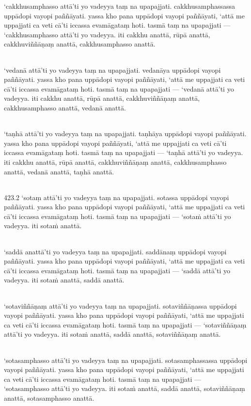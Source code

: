 \documentclass[9pt]{article}
\begin{document}
‘cakkhusamphasso attā’ti yo vadeyya taṃ na upapajjati. cakkhusamphassassa uppādopi vayopi paññāyati. yassa kho pana uppādopi vayopi paññāyati, ‘attā me uppajjati ca veti cā’ti iccassa evamāgataṃ hoti. tasmā taṃ na upapajjati — ‘cakkhusamphasso attā’ti yo vadeyya. iti cakkhu anattā, rūpā anattā, cakkhuviññāṇaṃ anattā, cakkhusamphasso anattā.\\\

‘vedanā attā’ti yo vadeyya taṃ na upapajjati. vedanāya uppādopi vayopi paññāyati. yassa kho pana uppādopi vayopi paññāyati, ‘attā me uppajjati ca veti cā’ti iccassa evamāgataṃ hoti. tasmā taṃ na upapajjati — ‘vedanā attā’ti yo vadeyya. iti cakkhu anattā, rūpā anattā, cakkhuviññāṇaṃ anattā, cakkhusamphasso anattā, vedanā anattā.\\\

‘taṇhā attā’ti yo vadeyya taṃ na upapajjati. taṇhāya uppādopi vayopi paññāyati. yassa kho pana uppādopi vayopi paññāyati, ‘attā me uppajjati ca veti cā’ti iccassa evamāgataṃ hoti. tasmā taṃ na upapajjati — ‘taṇhā attā’ti yo vadeyya. iti cakkhu anattā, rūpā anattā, cakkhuviññāṇaṃ anattā, cakkhusamphasso anattā, vedanā anattā, taṇhā anattā.\\\

423.2 ‘sotaṃ attā’ti yo vadeyya taṃ na upapajjati. sotassa uppādopi vayopi paññāyati. yassa kho pana uppādopi vayopi paññāyati, ‘attā me uppajjati ca veti cā’ti iccassa evamāgataṃ hoti. tasmā taṃ na upapajjati — ‘sotaṁ attā’ti yo vadeyya. iti sotaṁ anattā.\\\

‘saddā anattā’ti yo vadeyya taṃ na upapajjati. saddānaṃ uppādopi vayopi paññāyati. yassa kho pana uppādopi vayopi paññāyati, ‘attā me uppajjati ca veti cā’ti iccassa evamāgataṃ hoti. tasmā taṃ na upapajjati — ‘saddā attā’ti yo vadeyya. iti sotaṁ anattā, saddā anattā.\\\

‘sotaviññāṇaṃ attā’ti yo vadeyya taṃ na upapajjati. sotaviññāṇassa uppādopi vayopi paññāyati. yassa kho pana uppādopi vayopi paññāyati, ‘attā me uppajjati ca veti cā’ti iccassa evamāgataṃ hoti. tasmā taṃ na upapajjati — ‘sotaviññāṇaṃ attā’ti yo vadeyya. iti sotaṁ anattā, saddā anattā, sotaviññāṇaṃ anattā.\\\

‘sotasamphasso attā’ti yo vadeyya taṃ na upapajjati. sotasamphassassa uppādopi vayopi paññāyati. yassa kho pana uppādopi vayopi paññāyati, ‘attā me uppajjati ca veti cā’ti iccassa evamāgataṃ hoti. tasmā taṃ na upapajjati — ‘sotasamphasso attā’ti yo vadeyya. iti sotaṁ anattā, saddā anattā, sotaviññāṇaṃ anattā, sotasamphasso anattā.\\\
\end{document}
